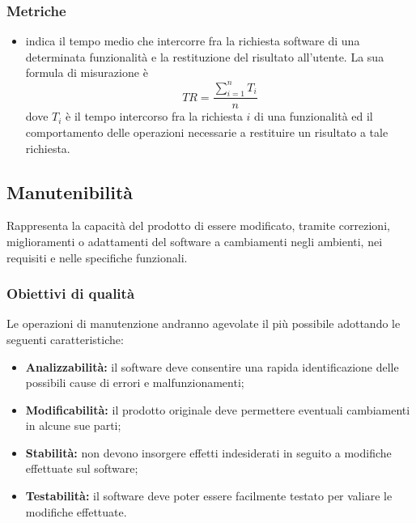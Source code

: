 \documentclass[PianoDiQualifica.tex]{subfiles}
\begin{document}
\subsubsection{Metriche}
\begin{itemize}
	\item {} indica il tempo medio che intercorre fra la richiesta software di una determinata funzionalità e la restituzione del risultato all'utente. La sua formula di misurazione è \[TR=\frac{\sum_{i=1}^n T_i}{n}\] dove $ T_i $ è il tempo intercorso fra la richiesta $ i $ di una funzionalità ed il comportamento delle operazioni necessarie a restituire un risultato a tale richiesta.	
\end{itemize}
\subsection{Manutenibilità}
Rappresenta la capacità del prodotto di essere modificato, tramite correzioni, miglioramenti o adattamenti del software a cambiamenti negli ambienti, nei requisiti e nelle specifiche funzionali.
\subsubsection{Obiettivi di qualità}
Le operazioni di manutenzione andranno agevolate il più possibile adottando le seguenti caratteristiche:
\begin{itemize}
	\item \textbf{Analizzabilità:} il software deve consentire una rapida identificazione delle possibili cause di errori e malfunzionamenti;
	\item \textbf{Modificabilità:} il prodotto originale deve permettere eventuali cambiamenti in alcune sue parti;
	\item \textbf{Stabilità:} non devono insorgere effetti indesiderati in seguito a modifiche effettuate sul software;
	\item \textbf{Testabilità:} il software deve poter essere facilmente testato per valiare le modifiche effettuate.
\end{itemize}
\end{document}

